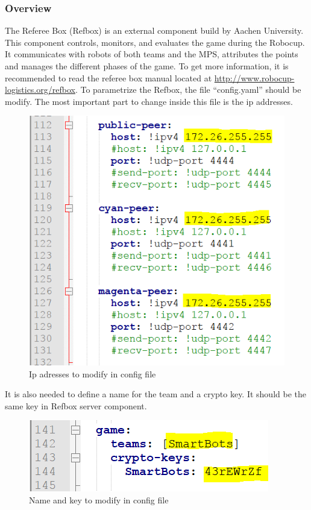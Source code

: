 
\subsubsection{Overview}

The Referee Box (Refbox) is an external component build by Aachen University. This component controls, monitors, and evaluates the game during the Robocup. It communicates with robots of both teams and the MPS, attributes the points and manages the different phases of the game. To get more information, it is recommended to read the referee box manual located at \url{http://www.robocup-logistics.org/refbox}. To parametrize the Refbox, the file “config.yaml” should be modify. The most important part to change inside this file is the ip addresses. \\

\begin{figure}[!h]
\centering
\includegraphics[]{pic/config_file_1.png}
\caption{Ip adresses to modify in config file}
\label{fig:configFile1}
\end{figure}

It is also needed to define a name for the team and a crypto key. It should be the same key in Refbox server component.

\begin{figure}[!h]
\centering
\includegraphics[]{pic/config_file_2.png}
\caption{Name and key to modify in config file}
\label{fig:configFile2}
\end{figure}

